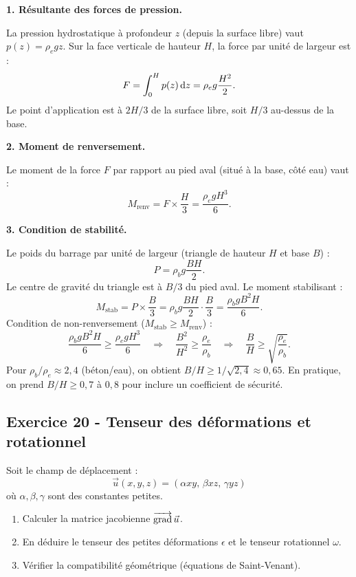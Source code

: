 \documentclass[12pt,a4paper]{article}
\begin{document}
\begin{boitecorrige}

\textbf{1. Résultante des forces de pression.}

La pression hydrostatique à profondeur $z$ (depuis la surface libre) vaut $p(z) = \rho_e g z$. Sur la face verticale de hauteur $H$, la force par unité de largeur est :
\[
F = \int_0^H p(z)\,\mathrm{d} z = \rho_e g \frac{H^2}{2}.
\]
Le point d'application est à $2H/3$ de la surface libre, soit $H/3$ au-dessus de la base.

\textbf{2. Moment de renversement.}

Le moment de la force $F$ par rapport au pied aval (situé à la base, côté eau) vaut :
\[
M_\text{renv} = F \times \frac{H}{3} = \frac{\rho_e g H^3}{6}.
\]

\textbf{3. Condition de stabilité.}

Le poids du barrage par unité de largeur (triangle de hauteur $H$ et base $B$) :
\[
P = \rho_b g \frac{BH}{2}.
\]
Le centre de gravité du triangle est à $B/3$ du pied aval. Le moment stabilisant :
\[
M_\text{stab} = P \times \frac{B}{3} = \rho_b g \frac{BH}{2}\cdot\frac{B}{3} = \frac{\rho_b g B^2 H}{6}.
\]
Condition de non-renversement ($M_\text{stab} \ge M_\text{renv}$) :
\[
\frac{\rho_b g B^2 H}{6} \ge \frac{\rho_e g H^3}{6} \quad\Rightarrow\quad \frac{B^2}{H^2} \ge \frac{\rho_e}{\rho_b} \quad\Rightarrow\quad \frac{B}{H} \ge \sqrt{\frac{\rho_e}{\rho_b}}.
\]
Pour $\rho_b/\rho_e \approx 2{,}4$ (béton/eau), on obtient $B/H \ge 1/\sqrt{2{,}4} \approx 0{,}65$. En pratique, on prend $B/H \ge 0{,}7$ à $0{,}8$ pour inclure un coefficient de sécurité.

\end{boitecorrige}

\subsection*{Exercice 20 - Tenseur des déformations et rotationnel \niveau{\difficile}}

\begin{boiteexercice}
Soit le champ de déplacement :
\[
\vec{u}(x,y,z) = (\alpha xy,\, \beta xz,\, \gamma yz)
\]
où $\alpha, \beta, \gamma$ sont des constantes petites.
\begin{enumerate}
  \item Calculer la matrice jacobienne $\overrightarrow{\mathrm{grad}}\,\vec{u}$.
  \item En déduire le tenseur des petites déformations $\epsilon$ et le tenseur rotationnel $\omega$.
  \item Vérifier la compatibilité géométrique (équations de Saint-Venant).
\end{enumerate}
\end{boiteexercice}
\end{document}
